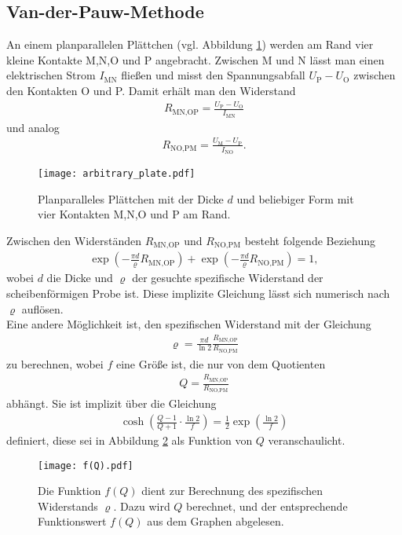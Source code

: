 \subsection{Van-der-Pauw-Methode}
An einem planparallelen Plättchen (vgl. Abbildung \ref{fig:vdP}) werden am Rand vier kleine Kontakte M,N,O und P angebracht. Zwischen M und N lässt man einen elektrischen Strom $I_\text{MN}$ fließen und misst den Spannungsabfall $U_\text{P}-U_\text{O}$ zwischen den Kontakten O und P. Damit erhält man den Widerstand
\begin{align}
R_\text{MN,OP}=\frac{U_\text{P}-U_\text{O}}{I_\text{MN}}
\end{align}
und analog
\begin{align}
R_\text{NO,PM}=\frac{U_\text{M}-U_\text{P}}{I_\text{NO}}.
\end{align}
\begin{figure}[h]
\centering
\texttt{[image: arbitrary\_plate.pdf]}
\caption{Planparalleles Plättchen mit der Dicke $d$ und beliebiger Form mit vier Kontakten M,N,O und P am Rand.}
\label{fig:vdP}
\end{figure}
Zwischen den Widerständen $R_\text{MN,OP}$ und $R_\text{NO,PM}$ besteht folgende Beziehung
\begin{align}
\exp\left(-\frac{\pi d}{\varrho}R_\text{MN,OP}\right)+\exp\left(-\frac{\pi d}{\varrho}R_\text{NO,PM}\right)=1,
\end{align}
wobei $d$ die Dicke und $\varrho$ der gesuchte spezifische Widerstand der scheibenförmigen Probe ist. Diese implizite Gleichung lässt sich numerisch nach $\varrho$ auflösen.\\
Eine andere Möglichkeit ist, den spezifischen Widerstand mit der Gleichung 
\begin{align}
\varrho=\frac{\pi d}{\ln 2}\frac{R_\text{MN,OP}}{R_\text{NO,PM}}
\end{align}
zu berechnen, wobei $f$ eine Größe ist, die nur von dem Quotienten
\begin{align}
Q=\frac{R_\text{MN,OP}}{R_\text{NO,PM}}
\end{align}
abhängt. Sie ist implizit über die Gleichung
\begin{align}
\cosh\left(\frac{Q-1}{Q+1}\cdot\frac{\ln 2}{f}\right)=\frac{1}{2}\exp\left(\frac{\ln 2}{f}\right)
\end{align}
definiert, diese sei in Abbildung \ref{fig:f(Q)} als Funktion von $Q$ veranschaulicht.\\
\begin{figure}[h]
\centering
\texttt{[image: f(Q).pdf]}
\caption{Die Funktion $f(Q)$ dient zur Berechnung des spezifischen Widerstands $\varrho$. Dazu wird $Q$ berechnet, und der entsprechende Funktionswert $f(Q)$ aus dem Graphen abgelesen.}
\label{fig:f(Q)}
\end{figure}

